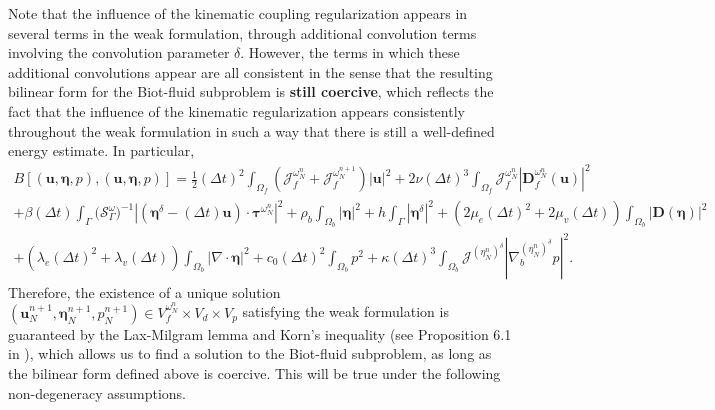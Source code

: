 \documentclass[11pt]{article}
\newcommand{\bd}{\boldsymbol}
\theoremstyle{definition}
\begin{document}
Note that the influence of the kinematic coupling regularization appears in several terms in the weak formulation, through additional convolution terms involving the convolution parameter $\delta$. However, the terms in which these additional convolutions appear are all consistent in the sense that the resulting bilinear form for the Biot-fluid subproblem is \textbf{still coercive}, which reflects the fact that the influence of the kinematic regularization appears consistently throughout the weak formulation in such a way that there is still a well-defined energy estimate. In particular,
\begin{multline}\label{coerciveB}
B[(\bd{u}, \bd{\eta}, p), (\bd{u}, \bd{\eta}, p)] = \frac{1}{2}(\Delta t)^{2} \int_{\Omega_{f}} \left(\mathcal{J}^{\omega^{n}_{N}}_{f} + \mathcal{J}^{\omega^{n + 1}_{N}}_{f}\right) |\bd{u}|^{2} + 2\nu (\Delta t)^{3} \int_{\Omega_{f}} \mathcal{J}^{\omega^{n}_{N}}_{f} |\bd{D}^{\omega^{n}_{N}}_{f}(\bd{u})|^{2} \\
+ \beta (\Delta t) \int_{\Gamma} \Big(\mathcal{S}^{\omega}_{\Gamma}\Big)^{-1} |(\bd{\eta}^{\delta} - (\Delta t) \bd{u}) \cdot \bd{\tau}^{\omega^{n}_{N}}|^{2} + \rho_{b} \int_{\Omega_{b}} |\bd{\eta}|^{2} + h \int_{\Gamma} |\bd{\eta}^{\delta}|^{2} + (2\mu_{e}(\Delta t)^{2} + 2\mu_{v}(\Delta t)) \int_{\Omega_{b}} |\bd{D}(\bd{\eta})|^{2} \\
+ (\lambda_{e}(\Delta t)^{2} + \lambda_{v}(\Delta t)) \int_{\Omega_{b}} |\nabla \cdot \bd{\eta}|^{2} + c_{0}(\Delta t)^{2} \int_{\Omega_{b}} p^{2} + \kappa(\Delta t)^{3} \int_{\Omega_{b}} \mathcal{J}^{(\eta^{n}_{N})^{\delta}} |\nabla^{(\eta^{n}_{N})^{\delta}}_{b} p|^{2}.
\end{multline}
Therefore, the existence of a unique solution $(\bd{u}^{n + 1}_{N}, \bd{\eta}^{n + 1}_{N}, p^{n + 1}_{N}) \in V^{\omega^{n}_{N}}_{f} \times V_{d} \times V_{p}$ satisfying the weak formulation is guaranteed by the Lax-Milgram lemma and Korn's inequality (see Proposition 6.1 in \cite{FPSIJMPA}), which allows us to find a solution to the Biot-fluid subproblem, as long as the bilinear form defined above is coercive. This will be true under the following non-degeneracy assumptions.
\end{document}
